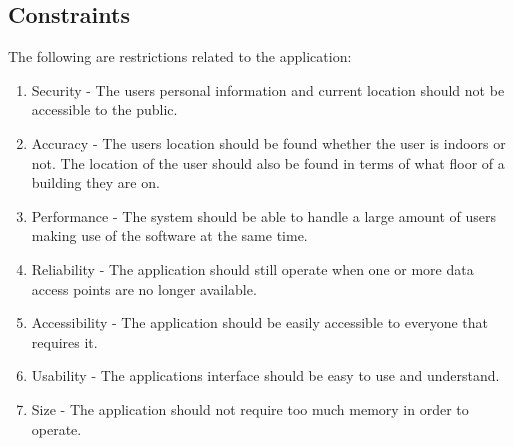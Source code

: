 \documentclass[11pt,a4paper]{article}
\begin{document}
	\subsection{Constraints}
	The following are restrictions related to the application:
		\begin{enumerate}
				\renewcommand{\labelenumi}{{\textbf{\arabic{enumi}.}}}
				\item Security  - The users personal information and current location should not be accessible to the public.
				\item Accuracy - The users location should be found whether the user is indoors or not. The location of the user should also be found in terms of what floor of a building they are on.
				\item Performance - The system should be able to handle a large amount of users making use of the software at the same time.
				\item Reliability - The application should still operate when one or more data access points are no longer available.
				\item Accessibility - The application should be easily accessible to everyone that requires it.
				\item Usability - The applications interface should be easy to use and understand.
				\item Size - The application should not require too much memory in order to operate.
				\end{enumerate}
\end{document}
